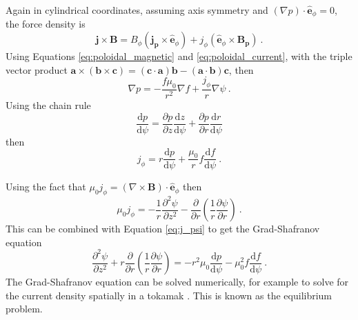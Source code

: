 \documentclass[10pt]{proc}
\newcommand{\diff}{\mathrm{d}}
\begin{document}
Again in cylindrical coordinates, assuming axis symmetry and $(\nabla p)\cdot\widehat{\mathbf{e}}_\phi=0$, the force density is
\begin{equation}
  \mathbf{j}\times\mathbf{B} =
  B_\phi\left(\mathbf{j_p}\times\widehat{\mathbf{e}}_\phi\right)
  +j_\phi\left(\widehat{\mathbf{e}}_\phi\times\mathbf{B_p}\right) \ .
\end{equation}
Using Equations \eqref{eq:poloidal_magnetic} and \eqref{eq:poloidal_current}, with the triple vector product $\mathbf{a}\times(\mathbf{b}\times\mathbf{c}) = (\mathbf{c}\cdot\mathbf{a})\mathbf{b} - (\mathbf{a}\cdot\mathbf{b})\mathbf{c}$, then
\begin{equation}
  \nabla p = -\dfrac{f\mu_0}{r^2}\nabla f+\dfrac{j_\phi}{r}\nabla \psi \ .
\end{equation}
Using the chain rule
\begin{equation}
\dfrac{\diff p}{\diff \psi} = \dfrac{\partial p}{\partial z}\dfrac{\diff z}{\diff \psi} + \dfrac{\partial p}{\partial r}\dfrac{\diff r}{\diff \psi}
\end{equation}
then
\begin{equation}
j_\phi = r\dfrac{\diff p}{\diff \psi}+\dfrac{\mu_0}{r}f\dfrac{\diff f}{\diff \psi} \ .
\label{eq:j_psi}
\end{equation}

Using the fact that $\mu_0j_\phi=\left(\nabla\times\mathbf{B}\right)\cdot\widehat{\mathbf{e}}_\phi$ then
\begin{equation}
  \mu_0j_\phi = -\dfrac{1}{r}\dfrac{\partial^2\psi}{\partial z^2}-\dfrac{\partial}{\partial r}
    \left(
      \dfrac{1}{r}\dfrac{\partial\psi}{\partial r}
    \right)
  \ .
\end{equation}
This can be combined with Equation \eqref{eq:j_psi} to get the Grad-Shafranov equation \citep{grad1958hydromagnetic} \citep{shafranov1966plasma}
\begin{equation}
\dfrac{\partial^2 \psi}{\partial z^2}+r\dfrac{\partial}{\partial r}\left(\dfrac{1}{r}\dfrac{\partial\psi}{\partial r}\right)
=
-r^2\mu_0\dfrac{\diff p}{\diff \psi}-\mu_0^2f\dfrac{\diff f}{\diff \psi}
\ .
\end{equation}
The Grad-Shafranov equation can be solved numerically, for example to solve for the current density spatially in a tokamak \citep{lao1985reconstruction}. This is known as the equilibrium problem.
\end{document}
